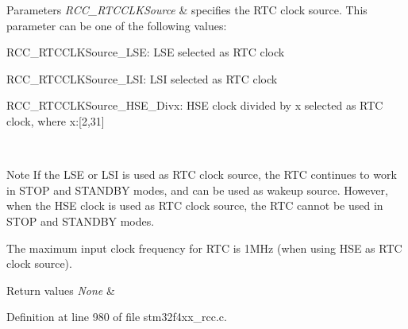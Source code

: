 \begin{DoxyParams}{Parameters}
{\em R\+C\+C\+\_\+\+R\+T\+C\+C\+L\+K\+Source} & specifies the R\+TC clock source. This parameter can be one of the following values\+: \begin{DoxyItemize}
\item R\+C\+C\+\_\+\+R\+T\+C\+C\+L\+K\+Source\+\_\+\+L\+SE\+: L\+SE selected as R\+TC clock \item R\+C\+C\+\_\+\+R\+T\+C\+C\+L\+K\+Source\+\_\+\+L\+SI\+: L\+SI selected as R\+TC clock \item R\+C\+C\+\_\+\+R\+T\+C\+C\+L\+K\+Source\+\_\+\+H\+S\+E\+\_\+\+Divx\+: H\+SE clock divided by x selected as R\+TC clock, where x\+:\mbox{[}2,31\mbox{]}\end{DoxyItemize}
\\
\hline
\end{DoxyParams}
\begin{DoxyNote}{Note}
If the L\+SE or L\+SI is used as R\+TC clock source, the R\+TC continues to work in S\+T\+OP and S\+T\+A\+N\+D\+BY modes, and can be used as wakeup source. However, when the H\+SE clock is used as R\+TC clock source, the R\+TC cannot be used in S\+T\+OP and S\+T\+A\+N\+D\+BY modes. 

The maximum input clock frequency for R\+TC is 1\+M\+Hz (when using H\+SE as R\+TC clock source).
\end{DoxyNote}

\begin{DoxyRetVals}{Return values}
{\em None} & \\
\hline
\end{DoxyRetVals}


Definition at line 980 of file stm32f4xx\+\_\+rcc.\+c.

